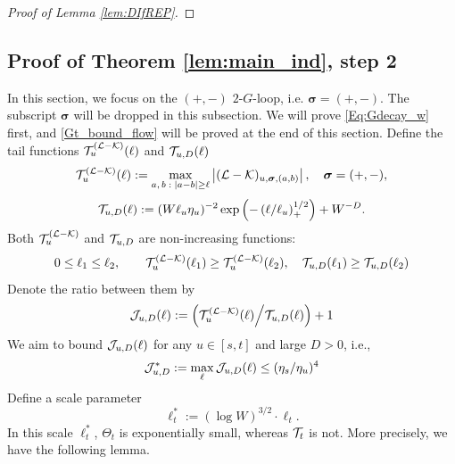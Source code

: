 \documentclass[10pt,reqno]{article}
\theoremstyle{plain} %
\theoremstyle{remark}
\numberwithin{equation}{section}
\begin{document}
\begin{proof}[Proof of Lemma \ref{lem:DIfREP}]
 
    
\end{proof}





 
  




\subsection{Proof of Theorem \ref{lem:main_ind}, step 2}
In this section,  we focus on the $(+,-)$ $2$-$G$-loop, i.e. $\boldsymbol{\sigma}=(+,-)$. The subscript $\boldsymbol{\sigma}$ will be dropped  in this subsection.  We will prove \eqref{Eq:Gdecay_w} first, and  \eqref{Gt_bound_flow} will be proved at the end of this  section. 
Define the tail functions ${\cal T}^{(\cal L-K)}_u (\ell)$ and ${\cal T}_{u,D} (\ell)$ 
\begin{equation}\label{def_WTu}
      {\cal T}^{(\cal L-K)}_u (\ell):= \max_{a,\,b\; : \; |a-b|\ge \ell} \left| ({\cal L-K})_{u,  \boldsymbol{\sigma},  ( a, b)}\right|,\quad  \boldsymbol{\sigma}=(+,-),
\end{equation}
\begin{equation}\label{def_WTuD}
{\cal T} _{u, D} (\ell) :=  (W\ell_u\eta_u)^{-2}
\exp \left(- \left( \ell /\ell_u \right)_+^{1/2} \right)+W^{-D}.
\end{equation} 
Both ${\cal T}^{(\cal L-K)}_u$ and ${\cal T}_{u,D}$ are non-increasing functions:
 $$
 0\le \ell_1\le \ell_2,\quad \quad 
 {\cal T}^{(\cal L-K)}_u (\ell_1)\ge {\cal T}^{(\cal L-K)}_u (\ell_2),\quad {\cal T} _{u,D} (\ell_1)\ge{\cal T} _{u,D}(\ell_2)
 $$
 Denote  the ratio between them by  %
\begin{equation}\label{def_Ju}
     {\cal J} _{u,D} (\ell):=   \left({\cal T}^{(\cal L-K)}_u (\ell) \Big/{\cal T}_{u,D} (\ell)\right)+1
\end{equation} 
We aim to bound $ {\cal J} _{u,D} (\ell)$ for any $u\in [s,t]$ and large $D>0$, i.e., 
 \begin{align}\label{shoellJJ}
    {\cal J}^* _{u,D} :=\max_{\ell}   {\cal J} _{u,D} (\ell)\le (\eta_s/\eta_u)^4 
  \end{align}
Define a  scale parameter 
$$
  \ell^{*}_t := (\log W)^{3/2}\cdot \ell_t .
$$
In this scale $\ell_t^*$,  $\Theta_t$ is exponentially small, whereas ${\cal T}_t$ is not. 
More precisely, we have the following lemma.  
\end{document}
